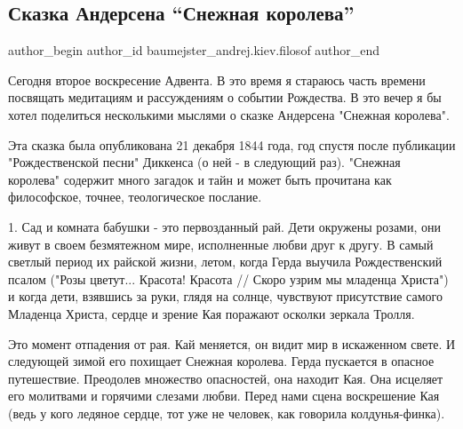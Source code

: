  
 
 
 
 
 
\subsection{Сказка Андерсена \enquote{Снежная королева}}
\label{sec:05_12_2021.fb.baumejster_andrej.kiev.filosof.1.skazka_andersen_snezhnaja_koroleva}
 
\ifcmt
 author_begin
   author_id baumejster_andrej.kiev.filosof
 author_end
\fi

Сегодня второе воскресение Адвента. В это время я стараюсь часть времени
посвящать медитациям и рассуждениям о событии Рождества. В это вечер я бы хотел
поделиться несколькими мыслями о сказке Андерсена "Снежная королева". 


Эта сказка была опубликована 21 декабря 1844 года, год спустя после публикации
"Рождественской песни" Диккенса (о ней - в следующий раз). "Снежная королева"
содержит много загадок и тайн и может быть прочитана как философское, точнее,
теологическое послание. 

1. Сад и комната бабушки - это первозданный рай. Дети окружены розами, они
живут в своем безмятежном мире, исполненные любви друг к другу. В самый светлый
период их райской жизни, летом, когда Герда выучила Рождественский псалом
("Розы цветут... Красота! Красота // Скоро узрим мы младенца Христа") и когда
дети, взявшись за руки, глядя на солнце, чувствуют присутствие самого Младенца
Христа, сердце и зрение Кая поражают осколки зеркала Тролля. 


Это момент отпадения от рая. Кай меняется, он видит мир в искаженном свете. И
следующей зимой его похищает Снежная королева. Герда пускается в опасное
путешествие. Преодолев множество опасностей, она находит Кая. Она исцеляет его
молитвами и горячими слезами любви. Перед нами сцена воскрешение Кая (ведь у
кого ледяное сердце, тот уже не человек, как говорила колдунья-финка). 

